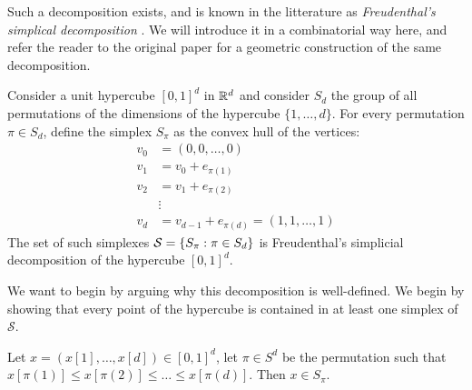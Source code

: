 Such a decomposition exists, and is known in the litterature as \textit{Freudenthal's simplical decomposition} . We will introduce it in a combinatorial way here, and refer the reader to the original paper for a geometric construction of the same decomposition.

\begin{definition}
    Consider a unit hypercube $[0, 1]^d$ in $\mathbb{R}^d$ and consider $S_d$ the group of all permutations of the dimensions of the hypercube $\{1, \dots, d\}$. For every permutation $\pi \in S_d$, define the simplex $S_{\pi}$ as the convex hull of the vertices:
    \begin{align*}
        v_0 & = (0, 0, \dots, 0)                        \\
        v_1 & = v_0 + e_{\pi(1)}                        \\
        v_2 & = v_1 + e_{\pi(2)}                        \\
            & \vdots                                    \\
        v_d & = v_{d-1} + e_{\pi(d)} = (1, 1, \dots, 1)
    \end{align*}
    The set of such simplexes $\mathcal{S} = \left\{S_{\pi} : \pi \in S_d\right\}$ is Freudenthal's simplicial decomposition of the hypercube $[0, 1]^d$.
\end{definition}
We want to begin by arguing why this decomposition is well-defined. We begin by showing that every point of the hypercube is contained in at least one simplex of $\mathcal{S}$.
\begin{lemma}
    \label{lem:caracterisation_of_simplices}
    Let $x = (x[1], \dots, x[d]) \in [0, 1]^d$, let $\pi \in S^d$ be the permutation such that $x[\pi(1)] \leq x[\pi(2)] \leq \dots \leq x[\pi(d)]$. Then $x \in S_{\pi}$.
\end{lemma}
